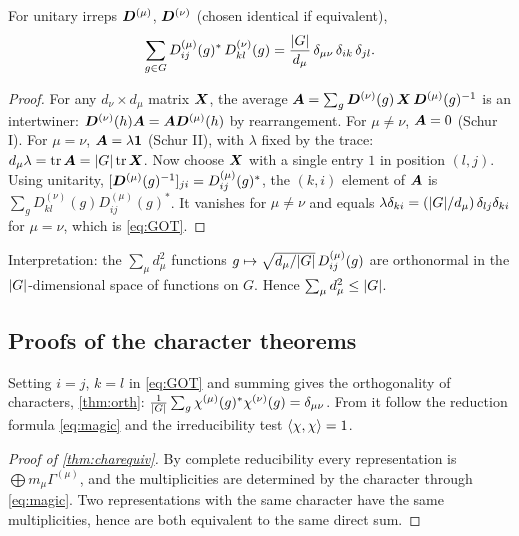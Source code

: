 \begin{theorem}\label{thm:GOT}
For unitary irreps $\bm{D}^{(\mu)}$, $\bm{D}^{(\nu)}$ (chosen identical if equivalent),
\begin{equation}\label{eq:GOT}
\sum_{g\in G}D^{(\mu)}_{ij}(g)^{*}\,D^{(\nu)}_{kl}(g)=\frac{\lvert G\rvert}{d_\mu}\,
\delta_{\mu\nu}\,\delta_{ik}\,\delta_{jl}.
\end{equation}
\end{theorem}
\begin{proof}
For any $d_\nu\times d_\mu$ matrix $\bm{X}$, the average
$\bm{A}=\sum_g\bm{D}^{(\nu)}(g)\,\bm{X}\,\bm{D}^{(\mu)}(g)^{-1}$ is an intertwiner:
$\bm{D}^{(\nu)}(h)\bm{A}=\bm{A}\bm{D}^{(\mu)}(h)$ by rearrangement. For $\mu\neq\nu$,
$\bm{A}=0$ (Schur I). For $\mu=\nu$, $\bm{A}=\lambda\bm{1}$ (Schur II), with $\lambda$
fixed by the trace: $d_\mu\lambda=\operatorname{tr}\bm{A}=\lvert G\rvert\operatorname{tr}\bm{X}$. Now choose $\bm{X}$ with a
single entry $1$ in position $(l,j)$. Using unitarity,
$[\bm{D}^{(\mu)}(g)^{-1}]_{ji}=D^{(\mu)}_{ij}(g)^{*}$, the $(k,i)$ element of $\bm{A}$ is
$\sum_gD^{(\nu)}_{kl}(g)D^{(\mu)}_{ij}(g)^{*}$. It vanishes for $\mu\neq\nu$ and equals
$\lambda\delta_{ki}=(\lvert G\rvert/d_\mu)\,\delta_{lj}\delta_{ki}$ for $\mu=\nu$, which is
\eqref{eq:GOT}.
\end{proof}
Interpretation: the $\sum_\mu d_\mu^2$ functions $g\mapsto\sqrt{d_\mu/\lvert G\rvert}\,D^{(\mu)}_{ij}(g)$
are orthonormal in the $\lvert G\rvert$-dimensional space of functions on $G$. Hence
$\sum_\mu d_\mu^2\le\lvert G\rvert$.

\subsection{Proofs of the character theorems}

Setting $i=j$, $k=l$ in \eqref{eq:GOT} and summing gives the orthogonality of
characters, \cref{thm:orth}:
$\frac{1}{\lvert G\rvert}\sum_g\chi^{(\mu)}(g)^{*}\chi^{(\nu)}(g)=\delta_{\mu\nu}$.
From it follow the reduction formula \eqref{eq:magic} and the irreducibility test
$\langle \chi, \chi\rangle=1$.

\begin{proof}[Proof of \cref{thm:charequiv}]
By complete reducibility every representation is $\bigoplus m_\mu\Gamma^{(\mu)}$, and
the multiplicities are determined by the character through \eqref{eq:magic}. Two
representations with the same character have the same multiplicities, hence are both
equivalent to the same direct sum.
\end{proof}

